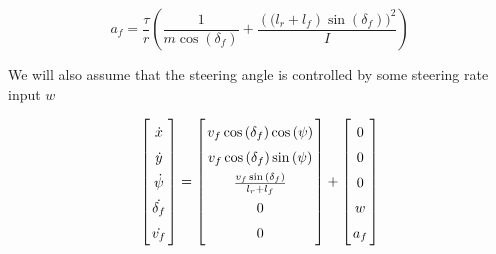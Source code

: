 \documentclass{article}
\theoremstyle{remark}
\theoremstyle{definition}
\begin{document}
$$ a_f = \frac{\tau}{r} \left ( \frac {1} {m \cos {( \delta_f) }} + \frac {\left((l_r+l_f\right)\sin {( \delta_f) } )^2} {I} \right ) $$

We will also assume that the steering angle is controlled by some steering rate input $w$

$$ \left \lbrack \arraycolsep=1.4pt\def\arraystretch{1.5} \begin{array}{c}
    \dot{x} \\
    \dot{y} \\
    \dot{\psi} \\
    \dot{\delta_f} \\
    \dot{v_f}
\end{array} \right \rbrack  = \left \lbrack \arraycolsep=1.4pt\def\arraystretch{1.5} \begin{array}{c}
    v_f \cos {( \delta_f) } \cos{( \psi )} \\
    v_f \cos {( \delta_f) } \sin{( \psi )} \\
    \frac {v_f \sin {( \delta_f) }} {l_r + l_f} \\
    0 \\
    0
\end{array} \right \rbrack + \left \lbrack \arraycolsep=1.4pt\def\arraystretch{1.5} \begin{array}{c}
    0 \\
    0 \\
    0 \\
    w \\
    a_f
\end{array} \right \rbrack $$
\end{document}
